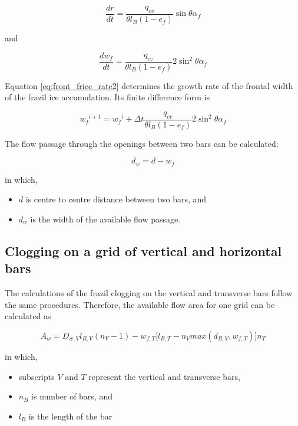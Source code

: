 \begin{equation} \label{eq:front_frice_rate1}\dfrac{dr}{dt} = \dfrac{q_{cv}}{\theta l_B(1-e_f)}\sin\theta \alpha_f
\end{equation}

and

\begin{equation} \label{eq:front_frice_rate2}
\dfrac{dw_f}{dt} = \dfrac{q_{cv}}{\theta l_B(1-e_f)}2{\sin}^2\theta \alpha_f
\end{equation}

Equation \eqref{eq:front_frice_rate2} determines the growth rate of the frontal width of the frazil ice accumulation. Its finite difference form is

\begin{equation} \label{eq:front_frice_rate3}
{w_f}^{i+1} = {w_f}^i +\Delta t \dfrac{q_{cv}}{\theta l_B(1-e_f)}2{\sin}^2\theta \alpha_f
\end{equation}

The flow passage through the openings between two bars can be calculated:

\begin{equation} \label{eq:flow_passage}
d_w = d-w_f
\end{equation}

in which,
\begin{itemize}
    \item $d$ is centre to centre distance between two bars, and
    \item $d_w$ is the width of the available flow passage.
\end{itemize}


\subsection{Clogging on a grid of vertical and horizontal bars}

The calculations of the frazil clogging on the vertical and transverse bars follow the same procedures. Therefore, the available flow area for one grid can be calculated as

\begin{equation} \label{eq:avail_flow_area}
A_w = D_{w,V}l_{B,V}(n_V-1)-w_{f,T}\big[l_{B,T}-n_Vmax(d_{B,V},w_{f,T})\big]n_T
\end{equation}

in which,
\begin{itemize}
    \item subscripts $V$ and $T$ represent the vertical and transverse bars,
    \item $n_B$ is number of bars, and
    \item $l_B$ is the length of the bar
\end{itemize}


\renewcommand{\labelitemi}{\textbullet}

\clearpage
